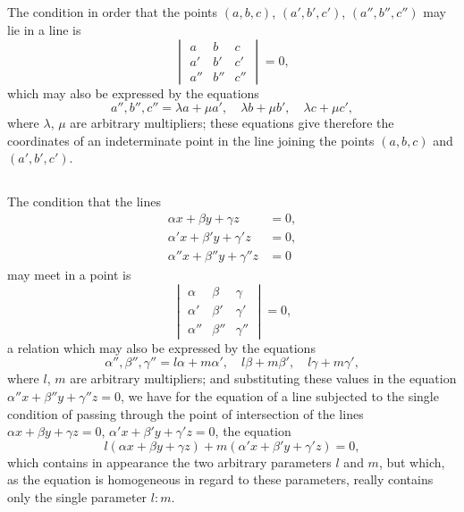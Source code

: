 \documentclass[12pt,a4paper]{article}
\begin{document}
\subsection{}

The condition in order that the points $(a, b, c)$, $(a', b', c')$, $(a'', b'', c'')$ may lie in a line is
\[
\begin{vmatrix}
a & b & c \\
a' & b' & c' \\
a'' & b'' & c''
\end{vmatrix} = 0,
\]
which may also be expressed by the equations
\[
a'', b'', c'' = \lambda a + \mu a', \quad \lambda b + \mu b', \quad \lambda c + \mu c',
\]
where $\lambda$, $\mu$ are arbitrary multipliers; these equations give therefore the coordinates of an indeterminate point in the line joining the points $(a, b, c)$ and $(a', b', c')$.

\subsection{}

The condition that the lines
\begin{align*}
\alpha x + \beta y + \gamma z &= 0,\\
\alpha' x + \beta' y + \gamma' z &= 0,\\
\alpha'' x + \beta'' y + \gamma'' z &= 0
\end{align*}
may meet in a point is
\[
\begin{vmatrix}
\alpha & \beta & \gamma \\
\alpha' & \beta' & \gamma' \\
\alpha'' & \beta'' & \gamma''
\end{vmatrix} = 0,
\]
a relation which may also be expressed by the equations
\[
\alpha'', \beta'', \gamma'' = l\alpha + m\alpha', \quad l\beta + m\beta', \quad l\gamma + m\gamma',
\]
where $l$, $m$ are arbitrary multipliers; and substituting these values in the equation $\alpha'' x + \beta'' y + \gamma'' z = 0$, we have for the equation of a line subjected to the single condition of passing through the point of intersection of the lines $\alpha x + \beta y + \gamma z = 0$, $\alpha' x + \beta' y + \gamma' z = 0$, the equation
\[
l(\alpha x + \beta y + \gamma z) + m(\alpha' x + \beta' y + \gamma' z) = 0,
\]
which contains in appearance the two arbitrary parameters $l$ and $m$, but which, as the equation is homogeneous in regard to these parameters, really contains only the single parameter $l : m$.
\end{document}
